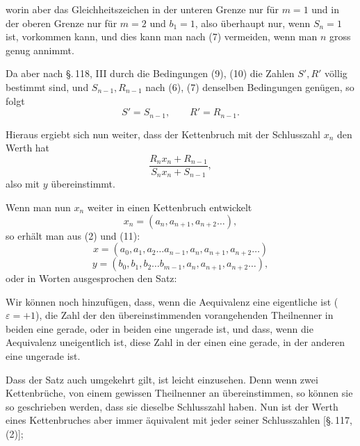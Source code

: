 worin aber das Gleichheitszeichen in der unteren Grenze nur für $m = 1$ und in der oberen Grenze nur für $m = 2$ und $b_1 = 1$, also überhaupt nur, wenn $S_n = 1$ ist, vorkommen kann, und dies kann man nach (7) vermeiden, wenn man $n$ gross genug annimmt.

Da aber nach \S.\,118, III durch die Bedingungen (9), (10) die Zahlen $S', R'$ völlig bestimmt sind, und $S_{n-1}, R_{n-1}$ nach (6), (7) denselben Bedingungen genügen, so folgt
\[
S' = S_{n-1}, \qquad R' = R_{n-1}.
\]

Hieraus ergiebt sich nun weiter, dass der Kettenbruch mit der Schlusszahl $x_n$
den Werth hat
\[
\dfrac{R_n x_n + R_{n-1}}{S_n x_n + S_{n-1}},
\]
also mit $y$ übereinstimmt.

Wenn man nun $x_n$ weiter in einen Kettenbruch entwickelt
\[
x_n = (a_n, a_{n+1}, a_{n+2} \ldots),
\]
so erhält man aus (2) und (11):
\[
x = (a_0, a_1, a_2 \ldots a_{n-1}, a_n, a_{n+1}, a_{n+2} \ldots)
\]
\[
y = (b_0, b_1, b_2 \ldots b_{m-1}, a_n, a_{n+1}, a_{n+2} \ldots),
\]
oder in Worten ausgesprochen den Satz:


Wir können noch hinzufügen, dass, wenn die Aequivalenz eine eigentliche ist ($\varepsilon = +1$), die Zahl der den übereinstimmenden vorangehenden Theilnenner in beiden eine gerade, oder in beiden eine ungerade ist, und dass, wenn die Aequivalenz uneigentlich ist, diese Zahl in der einen eine gerade, in der anderen eine ungerade ist.

Dass der Satz auch umgekehrt gilt, ist leicht einzusehen. Denn wenn zwei Kettenbrüche, von einem gewissen Theilnenner an übereinstimmen, so können sie so geschrieben werden, dass sie dieselbe Schlusszahl haben. Nun ist der Werth eines Kettenbruches aber immer äquivalent mit jeder seiner Schlusszahlen [\S.\,117, (2)]; 
